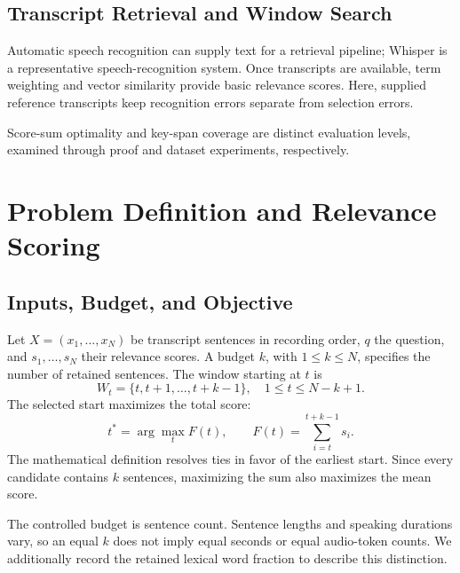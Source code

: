 \documentclass[10pt,journal,compsoc]{IEEEtran}
\begin{document}
\subsection{Transcript Retrieval and Window Search}
Automatic speech recognition can supply text for a retrieval pipeline; Whisper is a representative speech-recognition system\cite{radford2023whisper}. Once transcripts are available, term weighting and vector similarity provide basic relevance scores\cite{manning2008ir}. Here, supplied reference transcripts keep recognition errors separate from selection errors.

Score-sum optimality and key-span coverage are distinct evaluation levels, examined through proof and dataset experiments, respectively.

\section{Problem Definition and Relevance Scoring}
\subsection{Inputs, Budget, and Objective}
Let $X=(x_1,\ldots,x_N)$ be transcript sentences in recording order, $q$ the question, and $s_1,\ldots,s_N$ their relevance scores. A budget $k$, with $1\le k\le N$, specifies the number of retained sentences. The window starting at $t$ is
\begin{equation}
 W_t=\{t,t+1,\ldots,t+k-1\},\quad 1\le t\le N-k+1.
\end{equation}
The selected start maximizes the total score:
\begin{equation}
 t^*=\arg\max_t F(t),\qquad F(t)=\sum_{i=t}^{t+k-1}s_i.
 \label{eq:target}
\end{equation}
The mathematical definition resolves ties in favor of the earliest start. Since every candidate contains $k$ sentences, maximizing the sum also maximizes the mean score.

The controlled budget is sentence count. Sentence lengths and speaking durations vary, so an equal $k$ does not imply equal seconds or equal audio-token counts. We additionally record the retained lexical word fraction to describe this distinction.
\end{document}
